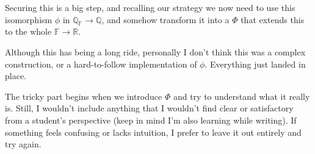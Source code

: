 Securing this is a big step, and recalling our strategy we now need to use this isomorphism $\phi$ in $\mathbb{Q_F} \rightarrow \mathbb{Q}$, and somehow transform it into a $\Phi$ that extends this to the whole $\mathbb{F} \rightarrow \mathbb{R}$.

Although this has being a long ride, personally I don't think this was a complex construction, or a hard-to-follow implementation of $\phi$. Everything just landed in place.

The tricky part begins when we introduce $\Phi$ and try to understand what it really is. Still, I wouldn’t include anything that I wouldn’t find clear or satisfactory from a student’s perspective (keep in mind I'm also learning while writing). If something feels confusing or lacks intuition, I prefer to leave it out entirely and try again.
